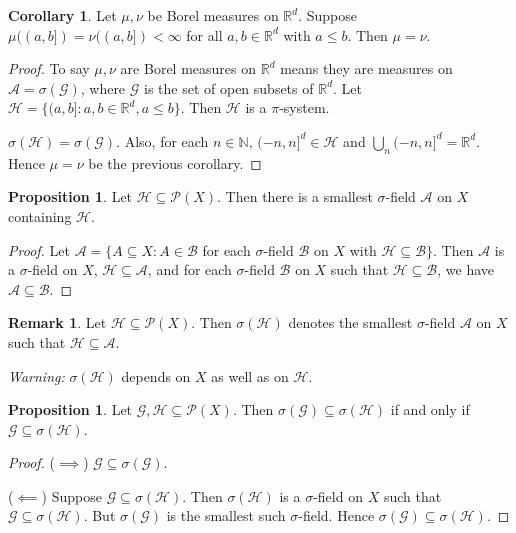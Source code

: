 \documentclass{article}
\newcommand{\R}{\mathbb{R}}
\newcommand{\N}{\mathbb{N}}
\theoremstyle{definition}
\newtheorem{corollary}[theorem]{Corollary}
\newtheorem{proposition}[theorem]{Proposition}
\newtheorem*{remark}{Remark}
\begin{document}
\begin{corollary}
    Let $\mu, \nu$ be Borel measures on $\R^d$. Suppose $\mu((a,b]) = \nu((a,b]) < \infty$ for all $a, b \in \R^d$ with $a \leq b$. Then $\mu = \nu$.
\end{corollary}
\begin{proof}
    To say $\mu, \nu$ are Borel measures on $\R^d$ means they are measures on $\mathscr{A} = \sigma(\mathscr{G})$, where $\mathscr{G}$ is the set of open subsets of $\R^d$.
    Let $\mathscr{H} = \{ (a,b] : a, b \in \R^d, a \leq b \}$. Then $\mathscr{H}$ is a $\pi$-system.
    
    $\sigma(\mathscr{H}) = \sigma(\mathscr{G})$. Also, for each $n \in \N$, $(-n,n]^d \in \mathscr{H}$ and $\bigcup_n (-n, n]^d = \R^d$. Hence $\mu = \nu$ be the previous corollary.
\end{proof}

\begin{proposition}
    Let $\mathscr{H} \subseteq \mathcal{P}(X)$. Then there is a smallest $\sigma$-field $\mathscr{A}$ on $X$ containing $\mathscr{H}$.
\end{proposition}
\begin{proof}
    Let $\mathscr{A} = \{A \subseteq X : A \in \mathscr{B}$ for each $\sigma$-field $\mathscr{B}$ on $X$ with $\mathscr{H} \subseteq \mathscr{B} \}$. Then $\mathscr{A}$ is a $\sigma$-field on $X$, $\mathscr{H} \subseteq \mathscr{A}$, and for each $\sigma$-field $\mathscr{B}$ on $X$ such that $\mathscr{H} \subseteq \mathscr{B}$, we have $\mathscr{A} \subseteq \mathscr{B}$.
\end{proof}

\begin{remark}
    Let $\mathscr{H} \subseteq \mathcal{P}(X)$. Then $\sigma(\mathscr{H})$ denotes the smallest $\sigma$-field $\mathscr{A}$ on $X$ such that $\mathscr{H} \subseteq \mathscr{A}$.
    
    \emph{Warning:} $\sigma(\mathscr{H})$ depends on $X$ as well as on $\mathscr{H}$.
\end{remark}

\begin{proposition}
    Let $\mathscr{G}, \mathscr{H} \subseteq \mathcal{P}(X)$. Then $\sigma(\mathscr{G}) \subseteq \sigma(\mathscr{H})$ if and only if $\mathscr{G} \subseteq \sigma(\mathscr{H})$.
\end{proposition}
\begin{proof}
    ($\implies$) $\mathscr{G} \subseteq \sigma(\mathscr{G})$.
    
    ($\impliedby$) Suppose $\mathscr{G} \subseteq \sigma(\mathscr{H})$. Then $\sigma(\mathscr{H})$ is a $\sigma$-field on $X$ such that $\mathscr{G} \subseteq \sigma(\mathscr{H})$.
    But $\sigma(\mathscr{G})$ is the smallest such $\sigma$-field. Hence $\sigma(\mathscr{G}) \subseteq \sigma(\mathscr{H})$.
\end{proof}
\end{document}
